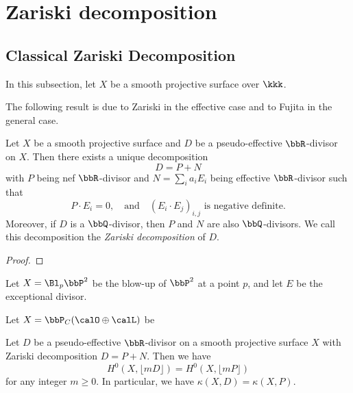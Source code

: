 \section{Zariski decomposition}







\subsection{Classical Zariski Decomposition}

  In this subsection, let $X$ be a smooth projective surface over $\kkk$.

  The following result is due to Zariski in the effective case and to Fujita in the general case.

  \begin{theorem}
    Let $X$ be a smooth projective surface and $D$ be a pseudo-effective $\bbR$-divisor on $X$. 
    Then there exists a unique decomposition
    \[ D = P + N \]
    with $P$ being nef $\bbR$-divisor and $N = \sum_i a_i E_i$ being effective $\bbR$-divisor 
    such that 
    \[ P \cdot E_i = 0, \quad \text{and} \quad (E_i \cdot E_j)_{i,j} \text{ is negative definite}. \]
    Moreover, if $D$ is a $\bbQ$-divisor, then $P$ and $N$ are also $\bbQ$-divisors.
    We call this decomposition the \emph{Zariski decomposition} of $D$.
  \end{theorem}
  \begin{proof}
    \Yang{}
  \end{proof}

  \begin{example}
    Let $X = \Bl_p \bbP^2$ be the blow-up of $\bbP^2$ at a point $p$, and let $E$ be the exceptional divisor.
      \Yang{}
  \end{example}

  \begin{example}
    Let $X = \bbP_C(\calO \oplus \calL)$ be 
    \Yang{}
  \end{example}

  \begin{proposition}
    Let $D$ be a pseudo-effective $\bbR$-divisor on a smooth projective surface $X$ with Zariski decomposition $D = P + N$. Then we have
    \[ H^0(X, \lfloor mD \rfloor) = H^0(X, \lfloor mP \rfloor) \]
    for any integer $m \geq 0$. In particular, we have $\kappa(X, D) = \kappa(X, P)$.
   \Yang{}
  \end{proposition}


